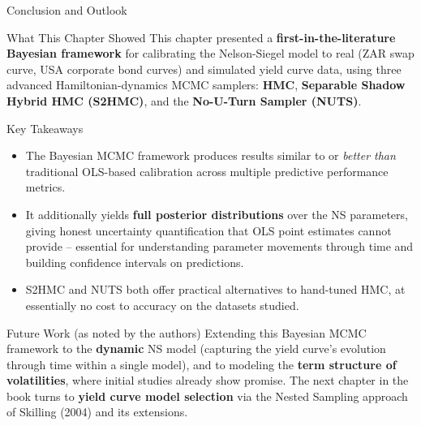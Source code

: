 \documentclass[aspectratio=169,10pt]{beamer}
\begin{document}
\begin{frame}[allowframebreaks]{Conclusion and Outlook}

\begin{block}{What This Chapter Showed}
  This chapter presented a \textbf{first-in-the-literature Bayesian
  framework} for calibrating the Nelson-Siegel model to real (ZAR swap
  curve, USA corporate bond curves) and simulated yield curve data, using
  three advanced Hamiltonian-dynamics MCMC samplers: \textbf{HMC},
  \textbf{Separable Shadow Hybrid HMC (S2HMC)}, and the \textbf{No-U-Turn
  Sampler (NUTS)}.
\end{block}

\begin{exampleblock}{Key Takeaways}
  \begin{itemize}
    \item The Bayesian MCMC framework produces results similar to or
      \emph{better than} traditional OLS-based calibration across multiple
      predictive performance metrics.
    \item It additionally yields \textbf{full posterior distributions}
      over the NS parameters, giving honest uncertainty quantification
      that OLS point estimates cannot provide -- essential for
      understanding parameter movements through time and building
      confidence intervals on predictions.
    \item S2HMC and NUTS both offer practical alternatives to hand-tuned
      HMC, at essentially no cost to accuracy on the datasets studied.
  \end{itemize}
\end{exampleblock}

\begin{alertblock}{Future Work (as noted by the authors)}
  Extending this Bayesian MCMC framework to the \textbf{dynamic} NS model
  (capturing the yield curve's evolution through time within a single
  model), and to modeling the \textbf{term structure of volatilities},
  where initial studies already show promise. The next chapter in the book
  turns to \textbf{yield curve model selection} via the Nested Sampling
  approach of Skilling (2004) and its extensions.
\end{alertblock}

\end{frame}
\end{document}
